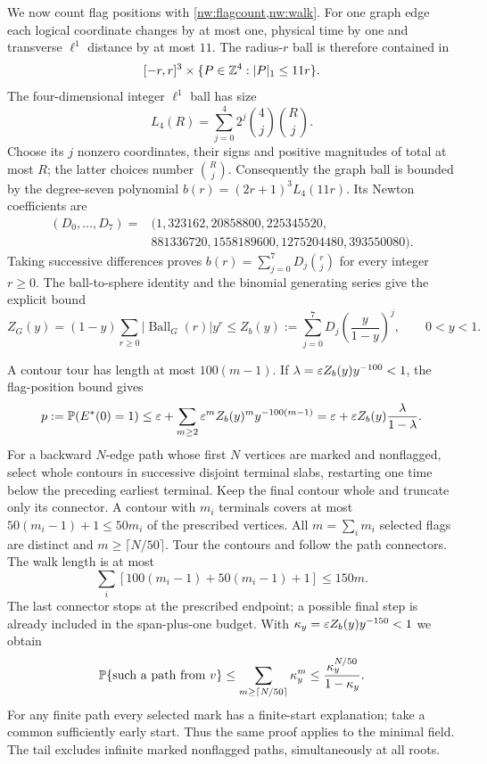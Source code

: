 We now count flag positions with \cref{nw:flagcount,nw:walk}. For one graph edge each logical coordinate changes by at most one, physical time by one and transverse $\ell^1$ distance by at most $11$. The radius-$r$ ball is therefore contained in
\[
 [-r,r]^3\times\{P\in\mathbb{Z}^4:|P|_1\le11r\}.
\]
The four-dimensional integer $\ell^1$ ball has size
\[
 L_4(R)=\sum_{j=0}^4 2^j\binom4j\binom Rj.
\]
Choose its $j$ nonzero coordinates, their signs and positive magnitudes of total at most $R$; the latter choices number $\binom Rj$. Consequently the graph ball is bounded by the degree-seven polynomial $b(r)=(2r+1)^3L_4(11r)$. Its Newton coefficients are
\[
 \begin{split}
 (D_0,\ldots,D_7)={}&(1,323162,20858800,225345520,\\
 &881336720,1558189600,1275204480,393550080).
 \end{split}
\]
Taking successive differences proves $b(r)=\sum_{j=0}^7D_j\binom rj$ for every integer $r\ge0$. The ball-to-sphere identity and the binomial generating series give the explicit bound
\[
 Z_G(y)=(1-y)\sum_{r\ge0}|\operatorname{Ball}_G(r)|y^r
 \le Z_b(y):=\sum_{j=0}^7D_j\left(\frac y{1-y}\right)^j,\qquad0<y<1.
\]


A contour tour has length at most $100(m-1)$. If $\lambda=\varepsilon Z_b(y)y^{-100}<1$, the flag-position bound gives
\[
 p:=\mathbb{P}(E^*(0)=1)\le\varepsilon+\sum_{m\ge2}\varepsilon^mZ_b(y)^my^{-100(m-1)}
 =\varepsilon+\varepsilon Z_b(y)\frac\lambda{1-\lambda}.
\]
For a backward $N$-edge path whose first $N$ vertices are marked and nonflagged, select whole contours in successive disjoint terminal slabs, restarting one time below the preceding earliest terminal. Keep the final contour whole and truncate only its connector. A contour with $m_i$ terminals covers at most $50(m_i-1)+1\le50m_i$ of the prescribed vertices. All $m=\sum_i m_i$ selected flags are distinct and $m\ge\lceil N/50\rceil$. Tour the contours and follow the path connectors. The walk length is at most
\[
 \sum_i[100(m_i-1)+50(m_i-1)+1]\le150m.
\]
The last connector stops at the prescribed endpoint; a possible final step is already included in the span-plus-one budget. With $\kappa_y=\varepsilon Z_b(y)y^{-150}<1$ we obtain
\[
 \mathbb{P}\{\text{such a path from }v\}\le
 \sum_{m\ge\lceil N/50\rceil}\kappa_y^m
 \le\frac{\kappa_y^{N/50}}{1-\kappa_y}.
\]
For any finite path every selected mark has a finite-start explanation; take a common sufficiently early start. Thus the same proof applies to the minimal field. The tail excludes infinite marked nonflagged paths, simultaneously at all roots.

